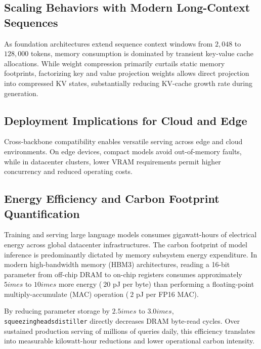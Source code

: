\subsection{Scaling Behaviors with Modern Long-Context Sequences}
As foundation architectures extend sequence context windows from $2{,}048$ to $128{,}000$ tokens, memory consumption is dominated by transient key-value cache allocations. While weight compression primarily curtails static memory footprints, factorizing key and value projection weights allows direct projection into compressed KV states, substantially reducing KV-cache growth rate during generation.

\subsection{Deployment Implications for Cloud and Edge}
Cross-backbone compatibility enables versatile serving across edge and cloud environments. On edge devices, compact models avoid out-of-memory faults, while in datacenter clusters, lower VRAM requirements permit higher concurrency and reduced operating costs.

\subsection{Energy Efficiency and Carbon Footprint Quantification}
Training and serving large language models consumes gigawatt-hours of electrical energy across global datacenter infrastructures. The carbon footprint of model inference is predominantly dictated by memory subsystem energy expenditure. In modern high-bandwidth memory (HBM3) architectures, reading a 16-bit parameter from off-chip DRAM to on-chip registers consumes approximately $5	imes$ to $10	imes$ more energy ($~20$ pJ per byte) than performing a floating-point multiply-accumulate (MAC) operation ($~2$ pJ per FP16 MAC).

By reducing parameter storage by $2.5	imes$ to $3.0	imes$, \texttt{squeezingheadsdistiller} directly decreases DRAM byte-read cycles. Over sustained production serving of millions of queries daily, this efficiency translates into measurable kilowatt-hour reductions and lower operational carbon intensity.
